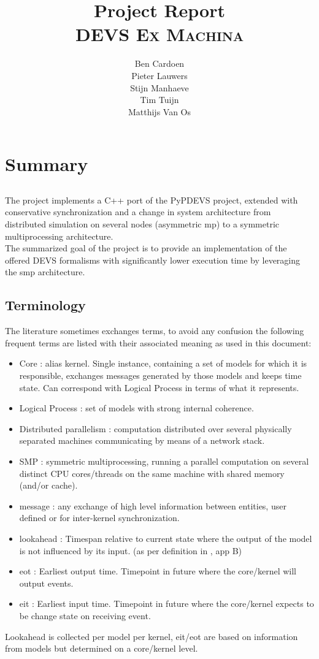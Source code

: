 \documentclass[8pt,a4paper]{report}
\title{Project Report\\\textsc{DEVS Ex Machina}}
\author{Ben Cardoen\\Pieter Lauwers\\Stijn Manhaeve\\Tim Tuijn\\Matthijs Van Os}
\date{}
\begin{document}
\maketitle
\tableofcontents{}

%
\chapter{Summary}
%
\section*{}
The project implements a C++ port of the PyPDEVS project, extended with conservative synchronization and a change in system architecture from distributed simulation on several nodes (asymmetric mp) to a symmetric multiprocessing architecture. \\The summarized goal of the project is to provide an implementation of the offered DEVS formalisms with significantly lower execution time by leveraging the smp architecture.

\section*{Terminology}
The literature sometimes exchanges terms, to avoid any confusion the following frequent terms are listed with their associated meaning as used in this document:
\begin{itemize}
  \item Core : alias kernel. Single instance, containing a set of models for which it is responsible, exchanges messages generated by those models and keeps time state. Can correspond with Logical Process in terms of what it represents.
  \item Logical Process : set of models with strong internal coherence.
  \item Distributed parallelism : computation distributed over several physically separated machines communicating by means of a network stack.
  \item SMP : symmetric multiprocessing, running a parallel computation on several distinct CPU cores/threads on the same machine with shared memory (and/or cache).
  \item message : any exchange of high level information between entities, user defined or for inter-kernel synchronization.
  \item lookahead : Timespan relative to current state where the output of the model is not influenced by its input. (as per definition in \cite{cons}, app B)
  \item eot : Earliest output time. Timepoint in future where the core/kernel will output events.
  \item eit : Earliest input time. Timepoint in future where the core/kernel expects to
  be change state on receiving event.
\end{itemize}
Lookahead is collected per model per kernel, eit/eot are based on information from models but determined on a core/kernel level.
\end{document}
